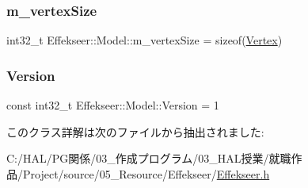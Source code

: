 \subsubsection{\texorpdfstring{m\+\_\+vertex\+Size}{m\_vertexSize}}
{\footnotesize\ttfamily int32\+\_\+t Effekseer\+::\+Model\+::m\+\_\+vertex\+Size = sizeof(\mbox{\hyperlink{struct_effekseer_1_1_model_1_1_vertex}{Vertex}})\hspace{0.3cm}{\ttfamily [protected]}}

\mbox{\label{class_effekseer_1_1_model_a9f5c2f10fde65efeb5bc603ed9d6436e}} 
\subsubsection{\texorpdfstring{Version}{Version}}
{\footnotesize\ttfamily const int32\+\_\+t Effekseer\+::\+Model\+::\+Version = 1\hspace{0.3cm}{\ttfamily [static]}}



このクラス詳解は次のファイルから抽出されました\+:\begin{DoxyCompactItemize}
\item 
C\+:/\+H\+A\+L/\+P\+G関係/03\+\_\+作成プログラム/03\+\_\+\+H\+A\+L授業/就職作品/\+Project/source/05\+\_\+\+Resource/\+Effekseer/\mbox{\hyperlink{_effekseer_8h}{Effekseer.\+h}}\end{DoxyCompactItemize}

